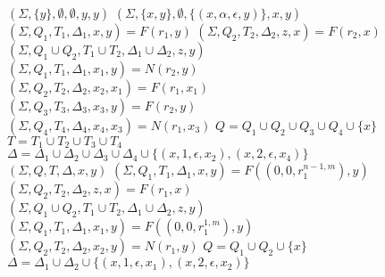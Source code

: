\documentclass[AMA,STIX1COL]{WileyNJD-v2}
\newcommand{\Xund}{\rule{.4em}{.4pt}}
\begin{document}
\begin{figure*}
\begin{multicols}{2}
\fontsize{8}{10}


    \newcommand \retonfa {F}
    \newcommand \ntag {N}

    \begin{algorithm}[H] \DontPrintSemicolon {} 
    \Fn {$\underline{\retonfa(r, y)} \smallskip$} {
         {
            \Return $(\Sigma, \{y\}, \emptyset, \emptyset, y, y)$ \;
        }
        \BlankLine
         {
            \Return $(\Sigma, \{x,y\}, \emptyset, \{(x, \alpha, \epsilon, y)\}, x, y)$ \;
        }
        \BlankLine
         {
            $(\Sigma, Q_1, T_1, \Delta_1, x, y) = \retonfa (r_1, y)$ \;
            $(\Sigma, Q_2, T_2, \Delta_2, z, x) = \retonfa (r_2, x)$ \;
            \Return $(\Sigma, Q_1 \cup Q_2, T_1 \cup T_2, \Delta_1 \cup \Delta_2, z, y)$ \;
        }
        \BlankLine
         {
            $(\Sigma, Q_1, T_1, \Delta_1, x_1, y) = \ntag (r_2, y)$ \;
            $(\Sigma, Q_2, T_2, \Delta_2, x_2, x_1) = \retonfa (r_1, x_1)$ \;
            $(\Sigma, Q_3, T_3, \Delta_3, x_3, y) = \retonfa (r_2, y)$ \;
            $(\Sigma, Q_4, T_4, \Delta_4, x_4, x_3) = \ntag (r_1, x_3)$ \;
            $Q = Q_1 \cup Q_2 \cup Q_3 \cup Q_4 \cup \{x\}$ \;
            $T = T_1 \cup T_2 \cup T_3 \cup T_4$ \;
            $\Delta = \Delta_1 \cup \Delta_2 \cup \Delta_3 \cup \Delta_4 \cup \{(x,1,\epsilon,x_2), (x,2,\epsilon,x_4)\}$ \;
            \Return $(\Sigma, Q, T, \Delta, x, y)$ \;
        }
        \BlankLine
         {
            $(\Sigma, Q_1, T_1, \Delta_1, x, y) = \retonfa ((0, 0, r_1^{n-1,m}), y)$ \;
            $(\Sigma, Q_2, T_2, \Delta_2, z, x) = \retonfa (r_1, x)$ \;
            \Return $(\Sigma, Q_1 \cup Q_2, T_1 \cup T_2, \Delta_1 \cup \Delta_2, z, y)$ \;
        }
        \BlankLine
         {
            $(\Sigma, Q_1, T_1, \Delta_1, x_1, y) = \retonfa ((0, 0, r_1^{1,m}), y)$ \;
            $(\Sigma, Q_2, T_2, \Delta_2, x_2, y) = \ntag (r_1, y)$ \;
            $Q = Q_1 \cup Q_2 \cup \{x\}$ \;
            $\Delta = \Delta_1 \cup \Delta_2 \cup \{(x,1,\epsilon,x_1), (x,2,\epsilon,x_2)\}$ \;
}}
\end{algorithm}
\end{multicols}
\end{figure*}
\end{document}

